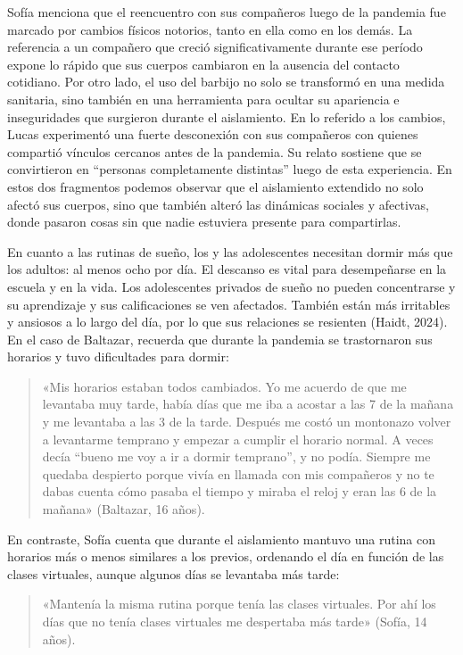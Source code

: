 Sofía menciona que el reencuentro con sus compañeros luego de la pandemia fue marcado por cambios físicos notorios, tanto en ella como en los demás. La referencia a un compañero que creció significativamente durante ese período expone lo rápido que sus cuerpos cambiaron en la ausencia del contacto cotidiano. Por otro lado, el uso del barbijo no solo se transformó en una medida sanitaria, sino también en una herramienta para ocultar su apariencia e inseguridades que surgieron durante el aislamiento. En lo referido a los cambios, Lucas experimentó una fuerte desconexión con sus compañeros con quienes compartió vínculos cercanos antes de la pandemia. Su relato sostiene que se convirtieron en ``personas completamente distintas'' luego de esta experiencia. En estos dos fragmentos podemos observar que el aislamiento extendido no solo afectó sus cuerpos, sino que también alteró las dinámicas sociales y afectivas, donde pasaron cosas sin que nadie estuviera presente para compartirlas.

En cuanto a las rutinas de sueño, los y las adolescentes necesitan dormir más que los adultos: al menos ocho por día. El descanso es vital para desempeñarse en la escuela y en la vida. Los adolescentes privados de sueño no pueden concentrarse y su aprendizaje y sus calificaciones se ven afectados. También están más irritables y ansiosos a lo largo del día, por lo que sus relaciones se resienten (Haidt, 2024). En el caso de Baltazar, recuerda que durante la pandemia se trastornaron sus horarios y tuvo dificultades para dormir:

\begin{quote}
«Mis horarios estaban todos cambiados. Yo me acuerdo de que me levantaba muy tarde, había días que me iba a acostar a las 7 de la mañana y me levantaba a las 3 de la tarde. Después me costó un montonazo volver a levantarme temprano y empezar a cumplir el horario normal. A veces decía ``bueno me voy a ir a dormir temprano'', y no podía. Siempre me quedaba despierto porque vivía en llamada con mis compañeros y no te dabas cuenta cómo pasaba el tiempo y miraba el reloj y eran las 6 de la mañana» (Baltazar, 16 años).
\end{quote}

En contraste, Sofía cuenta que durante el aislamiento mantuvo una rutina con horarios más o menos similares a los previos, ordenando el día en función de las clases virtuales, aunque algunos días se levantaba más tarde:

\begin{quote}
«Mantenía la misma rutina porque tenía las clases virtuales. Por ahí los días que no tenía clases virtuales me despertaba más tarde» (Sofía, 14 años).
\end{quote}

